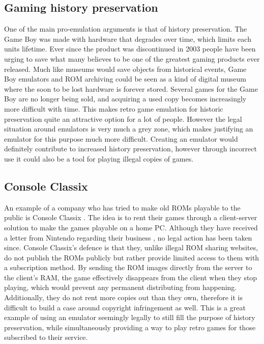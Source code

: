 \subsection{Gaming history preservation}
One of the main pro-emulation arguments is that of history preservation. The Game Boy was made with hardware that degrades over time, which limits each units lifetime. Ever since the product was discontinued in 2003 \cite{gameBoyDisc} people have been urging to save what many believes to be one of the greatest gaming products ever released. Much like museums would save objects from historical events, Game Boy emulators and ROM archiving could be seen as a kind of digital museum where the soon to be lost hardware is forever stored. Several games for the Game Boy are no longer being sold, and acquiring a used copy becomes increasingly more difficult with time. This makes retro game emulation for historic preservation quite an attractive option for a lot of people. However the legal situation around emulators is very much a grey zone, which makes justifying an emulator for this purpose much more difficult. Creating an emulator would definitely contribute to increased history preservation, however through incorrect use it could also be a tool for playing illegal copies of games.

\subsection{Console Classix}
An example of a company who has tried to make old ROMs playable to the public is Console Classix \cite{romLegal}. The idea is to rent their games through a client-server solution to make the games playable on a home PC. Although they have received a letter from Nintendo regarding their business \cite{letterFromNintendo}, no legal action has been taken since. Console Classix's defence is that they, unlike illegal ROM sharing websites, do not publish the ROMs publicly but rather provide limited access to them with a subscription method. By sending the ROM images directly from the server to the client's RAM, the game effectively disappears from the client when they stop playing, which would prevent any permanent distributing from happening. Additionally, they do not rent more copies out than they own, therefore it is difficult to build a case around copyright infringement as well. This is a great example of using an emulator seemingly legally to still fill the purpose of history preservation, while simultaneously providing a way to play retro games for those subscribed to their service.


